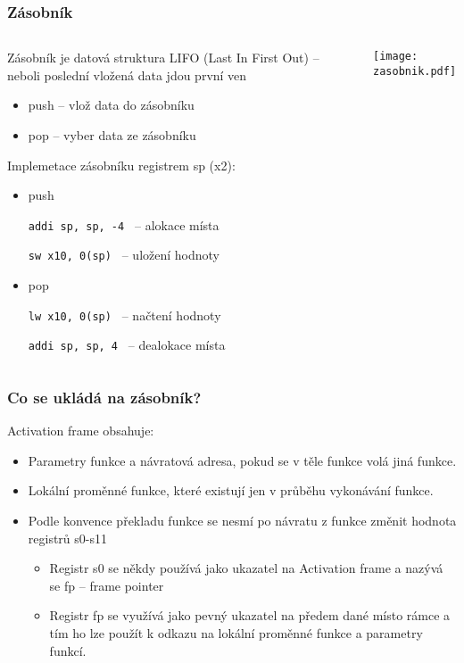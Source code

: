 \documentclass{beamer}
\begin{document}
\begin{frame}
\frametitle{Zásobník}

\begin{columns}
\begin{column}{0.7\textwidth}
Zásobník je datová struktura LIFO (Last In First Out) -- neboli poslední vložená data jdou první ven
\begin{itemize}
 \item push -- vlož data do zásobníku
 \item pop -- vyber data ze zásobníku
\end{itemize}

Implemetace zásobníku registrem sp (x2):
\begin{itemize}
 \item push 
 
\texttt{addi sp, sp, -4 \phantom{xx}}  -- alokace místa

\texttt{sw \phantom{xx}x10, 0(sp) \phantom{xx}}  -- uložení hodnoty
 
 \item pop

\texttt{lw \phantom{xx}x10, 0(sp) \phantom{xx}}  -- načtení hodnoty

\texttt{addi sp, sp, 4 \phantom{xxx}}  -- dealokace místa

\end{itemize}

\end{column}
\hfill
\begin{column}{0.3\textwidth}  
\texttt{[image: zasobnik.pdf]}
\end{column}
\end{columns}

\end{frame}

\begin{frame}
\frametitle{Co se ukládá na zásobník?}

Activation frame obsahuje:
\begin{itemize}
 \item Parametry funkce a návratová adresa, pokud se v těle funkce volá jiná funkce.
 \item Lokální proměnné funkce, které existují jen v průběhu vykonávání funkce.
 \item Podle konvence překladu funkce se nesmí po návratu z funkce změnit hodnota registrů s0-s11
\begin{itemize}
 \item Registr s0 se někdy používá jako ukazatel na Activation frame a nazývá se fp -- frame pointer
 \item Registr fp se využívá jako pevný ukazatel na předem dané místo rámce a tím ho lze použít k odkazu na lokální proměnné funkce a parametry funkcí.
\end{itemize}
\end{itemize}
\end{frame}
\end{document}

